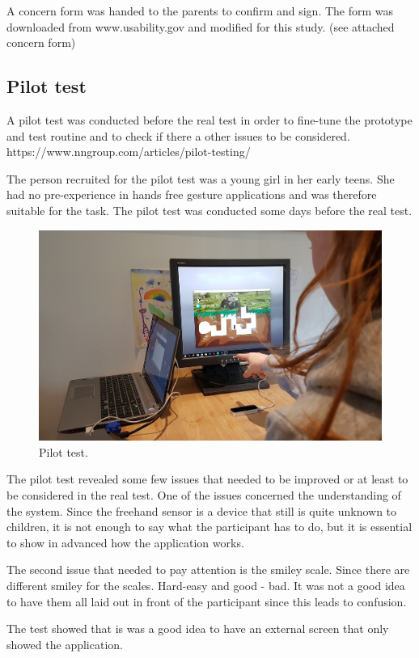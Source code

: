 A concern form was handed to the parents to confirm and sign. The form was downloaded from www.usability.gov and modified for this study. (see attached concern form)


\subsection{Pilot test}

A pilot test was conducted before the real test in order to fine-tune the prototype and test routine and to check if there a other issues to be considered. 
https://www.nngroup.com/articles/pilot-testing/

The person recruited for the pilot test was a young girl in her early teens. She had no pre-experience in hands free gesture applications and was therefore suitable for the task.
The pilot test was conducted some days before the real test.

\begin{figure}[h]  %
  \centering
  \includegraphics[width=.5\textwidth]{figures/pilottest.jpg}
  \caption[Pilot test.]{Pilot test.}
  \label{fig:setup}
\end{figure}

The pilot test revealed some few issues that needed to be improved or at least to be considered in the real test.  One of the issues concerned the understanding of the system. Since the freehand sensor is a device that still is quite unknown to children,  it is  not enough to say what the participant has to do, but it is  essential to show in advanced how the application works.

The second issue that needed to pay attention is the smiley scale. Since there are different smiley for the scales. Hard-easy and good - bad. It was not a good idea to have them all laid out in front of the participant since this leads to confusion.

The test showed that is was a good idea to have an external screen that only showed the application. 

